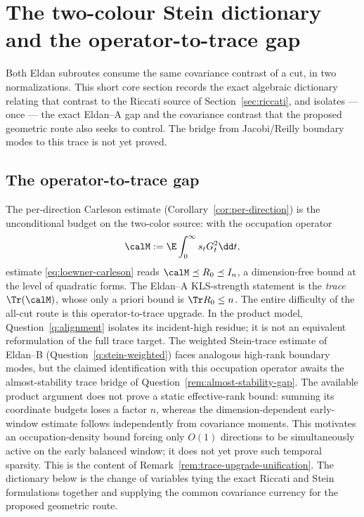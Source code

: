 \documentclass[../../main.tex]{subfiles}
\begin{document}
\section{The two-colour Stein dictionary and the operator-to-trace gap}
\label{sec:stein-dictionary}

Both Eldan subroutes consume the same covariance contrast of a cut, in two
normalizations. This short core section records the exact algebraic dictionary relating that
contrast to the Riccati source of Section~\ref{sec:riccati}, and isolates --- once --- the
exact Eldan--A gap and the covariance contrast that the proposed geometric route also seeks to
control. The bridge from Jacobi/Reilly boundary modes to this trace is not yet proved.

\subsection{The operator-to-trace gap}
\label{subsec:one-gap}

The per-direction Carleson estimate (Corollary~\ref{cor:per-direction}) is the unconditional
budget on the two-color source: with the occupation operator
\[
  \calM:=\E\int_0^\infty s_tG_t^2\dd t,
\]
estimate \eqref{eq:loewner-carleson} reads $\calM\preceq R_0\preceq I_n$, a dimension-free
bound at the level of quadratic forms. The Eldan--A KLS-strength statement is the \emph{trace}
$\Tr(\calM)$, whose only a priori bound is $\Tr R_0\le n$. The entire difficulty of the
all-cut route is this operator-to-trace upgrade. In the product model,
Question~\ref{q:alignment} isolates its incident-high residue; it is not an equivalent
reformulation of the full trace target. The weighted Stein-trace estimate of Eldan--B
(Question~\ref{q:stein-weighted}) faces analogous high-rank boundary modes, but the claimed
identification with this occupation operator awaits the almost-stability trace bridge of
Question~\ref{rem:almost-stability-gap}. The available product argument does not prove a static
effective-rank bound: summing its coordinate budgets loses a factor $n$, whereas the
dimension-dependent early-window estimate follows independently from covariance moments.
This motivates an occupation-density bound forcing only $O(1)$ directions to be simultaneously
active on the early balanced window; it does not yet prove such temporal sparsity. This is the content of
Remark~\ref{rem:trace-upgrade-unification}. The dictionary below is the change of variables
tying the exact Riccati and Stein formulations together and supplying the common covariance currency
for the proposed geometric route.
\end{document}
